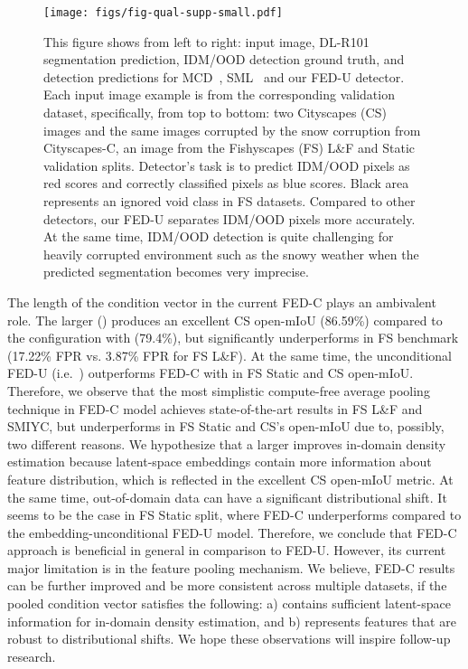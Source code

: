 \documentclass[accepted, startpage]{uai2023}
\newcommand{\ie}{i.e.}
\begin{document}
\begin{figure*}[th]
	\centering
	\texttt{[image: figs/fig-qual-supp-small.pdf]}
	\caption{This figure shows from left to right: input image, DL-R101 segmentation prediction, IDM/OOD detection ground truth, and detection predictions for MCD~\citep{ken}, SML~\citep{Jung_2021_ICCV} and our FED-U detector. Each input image example is from the corresponding validation dataset, specifically, from top to bottom: two Cityscapes (CS) images and the same images corrupted by the snow corruption from Cityscapes-C, an image from the Fishyscapes (FS) L\&F and Static validation splits. Detector's task is to predict IDM/OOD pixels as red scores and correctly classified pixels as blue scores. Black area represents an ignored void class in FS datasets. Compared to other detectors, our FED-U separates IDM/OOD pixels more accurately. At the same time, IDM/OOD detection is quite challenging for heavily corrupted environment such as the snowy weather when the predicted segmentation becomes very imprecise.}
	\label{fig:qual-supp}
\end{figure*}

The length  of the condition vector  in the current FED-C plays an ambivalent role. The larger () produces an excellent CS open-mIoU (86.59\%) compared to the configuration with  (79.4\%), but significantly underperforms in FS benchmark (17.22\% FPR vs. 3.87\% FPR for FS L\&F). At the same time, the unconditional FED-U (\ie~) outperforms FED-C with  in FS Static and CS open-mIoU. Therefore, we observe that the most simplistic compute-free average pooling technique in FED-C model achieves state-of-the-art results in FS L\&F and SMIYC, but underperforms in FS Static and CS's open-mIoU due to, possibly, two different reasons. We hypothesize that a larger  improves in-domain density estimation because latent-space embeddings contain more information about feature distribution, which is reflected in the excellent CS open-mIoU metric. At the same time, out-of-domain data can have a significant distributional shift. It seems to be the case in FS Static split, where FED-C underperforms compared to the embedding-unconditional FED-U model. Therefore, we conclude that FED-C approach is beneficial in general in comparison to FED-U. However, its current major limitation is in the feature pooling mechanism. We believe, FED-C results can be further improved and be more consistent across multiple datasets, if the pooled condition vector  satisfies the following: a) contains sufficient latent-space information for in-domain density estimation, and b) represents features that are robust to distributional shifts. We hope these observations will inspire follow-up research.
\end{document}
